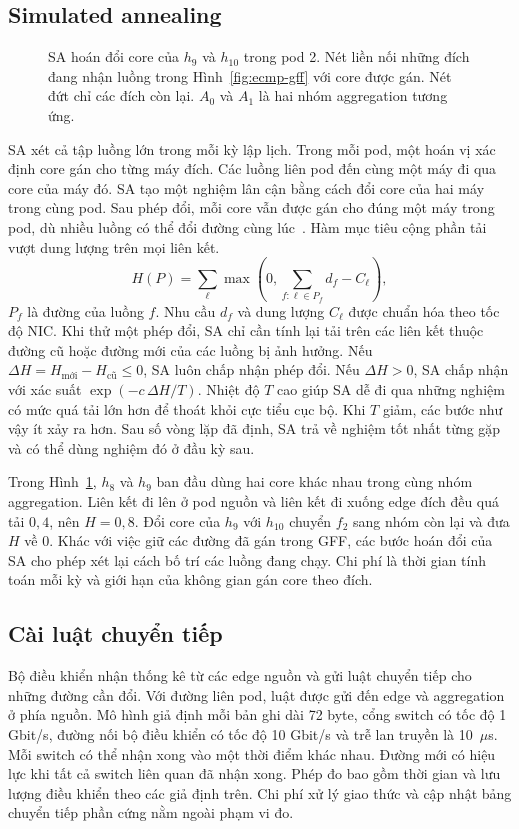 \documentclass[conference,a4paper]{IEEEtran}
\newcommand{\widediagram}[3]{%
  \begin{figure}[!tp]\centering
  \caption{#2}\label{fig:#3}
  \end{figure}}
\begin{document}
\subsection{Simulated annealing}
\widediagram{sa-swap}{SA hoán đổi core của \(h_9\) và \(h_{10}\) trong pod 2. Nét liền nối những đích đang nhận luồng trong Hình~\ref{fig:ecmp-gff} với core được gán. Nét đứt chỉ các đích còn lại. \(A_0\) và \(A_1\) là hai nhóm aggregation tương ứng.}{sa-swap}
SA xét cả tập luồng lớn trong mỗi kỳ lập lịch. Trong mỗi pod, một hoán vị xác định core gán cho từng máy đích. Các luồng liên pod đến cùng một máy đi qua core của máy đó. SA tạo một nghiệm lân cận bằng cách đổi core của hai máy trong cùng pod. Sau phép đổi, mỗi core vẫn được gán cho đúng một máy trong pod, dù nhiều luồng có thể đổi đường cùng lúc~\cite{hedera}. Hàm mục tiêu cộng phần tải vượt dung lượng trên mọi liên kết.
\begin{equation}
H(P)=\sum_{\ell}\max\!\left(0,\sum_{f:\ell\in P_f}d_f-C_{\ell}\right),
\label{eq:energy}
\end{equation}
\(P_f\) là đường của luồng \(f\). Nhu cầu \(d_f\) và dung lượng \(C_\ell\) được chuẩn hóa theo tốc độ NIC. Khi thử một phép đổi, SA chỉ cần tính lại tải trên các liên kết thuộc đường cũ hoặc đường mới của các luồng bị ảnh hưởng. Nếu \(\Delta H=H_{\mathrm{mới}}-H_{\mathrm{cũ}}\le 0\), SA luôn chấp nhận phép đổi. Nếu \(\Delta H>0\), SA chấp nhận với xác suất \(\exp(-c\,\Delta H/T)\). Nhiệt độ \(T\) cao giúp SA dễ đi qua những nghiệm có mức quá tải lớn hơn để thoát khỏi cực tiểu cục bộ. Khi \(T\) giảm, các bước như vậy ít xảy ra hơn. Sau số vòng lặp đã định, SA trả về nghiệm tốt nhất từng gặp và có thể dùng nghiệm đó ở đầu kỳ sau.

Trong Hình~\ref{fig:sa-swap}, \(h_8\) và \(h_9\) ban đầu dùng hai core khác nhau trong cùng nhóm aggregation. Liên kết đi lên ở pod nguồn và liên kết đi xuống edge đích đều quá tải \(0{,}4\), nên \(H=0{,}8\). Đổi core của \(h_9\) với \(h_{10}\) chuyển \(f_2\) sang nhóm còn lại và đưa \(H\) về \(0\). Khác với việc giữ các đường đã gán trong GFF, các bước hoán đổi của SA cho phép xét lại cách bố trí các luồng đang chạy. Chi phí là thời gian tính toán mỗi kỳ và giới hạn của không gian gán core theo đích.

\subsection{Cài luật chuyển tiếp}
Bộ điều khiển nhận thống kê từ các edge nguồn và gửi luật chuyển tiếp cho những đường cần đổi. Với đường liên pod, luật được gửi đến edge và aggregation ở phía nguồn. Mô hình giả định mỗi bản ghi dài 72 byte, cổng switch có tốc độ 1 Gbit/s, đường nối bộ điều khiển có tốc độ 10 Gbit/s và trễ lan truyền là 10~\(\mu\)s. Mỗi switch có thể nhận xong vào một thời điểm khác nhau. Đường mới có hiệu lực khi tất cả switch liên quan đã nhận xong. Phép đo bao gồm thời gian và lưu lượng điều khiển theo các giả định trên. Chi phí xử lý giao thức và cập nhật bảng chuyển tiếp phần cứng nằm ngoài phạm vi đo.
\end{document}
